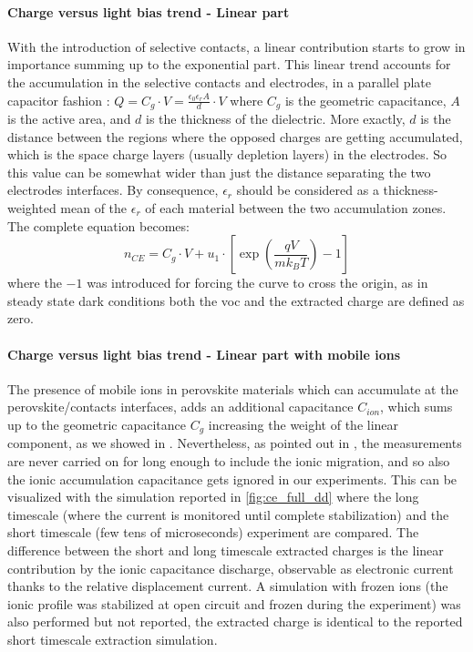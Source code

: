 \paragraph{Charge versus light bias trend - Linear part}
With the introduction of selective contacts, a linear contribution starts to grow in importance summing up to the exponential part.
This linear trend accounts for the accumulation in the selective contacts and electrodes, in a parallel plate capacitor fashion \cite{Gelmetti2017,Ryan2017a}: $Q = C_g \cdot V = \frac{\epsilon_0 \epsilon_r A}{d} \cdot V$ where $C_g$ is the geometric capacitance, $A$ is the active area, and $d$ is the thickness of the dielectric.
More exactly, $d$ is the distance between the regions where the opposed charges are getting accumulated, which is the space charge layers (usually depletion layers) in the electrodes.
So this value can be somewhat wider than just the distance separating the two electrodes interfaces.
By consequence, $\epsilon_r$ should be considered as a thickness-weighted mean of the $\epsilon_r$ of each material between the two accumulation zones.
The complete equation becomes:
\begin{equation}\label{eq:ce_full}
n_{CE} = C_g \cdot V + u_1 \cdot \left[\exp\left(\frac{qV}{mk_BT}\right) - 1\right]
\end{equation}
where the $-1$ was introduced for forcing the curve to cross the origin, as in steady state dark conditions both the \gls{voc} and the extracted charge are defined as zero.

\paragraph{Charge versus light bias trend - Linear part with mobile ions}
The presence of mobile ions in perovskite materials which can accumulate at the perovskite/contacts interfaces, adds an additional capacitance $C_{ion}$, which sums up to the geometric capacitance $C_g$ increasing the weight of the linear component, as we showed in . Nevertheless, as pointed out in , the  measurements are never carried on for long enough to include the ionic migration, and so also the ionic accumulation capacitance gets ignored in our experiments. This can be visualized with the simulation reported in \cref{fig:ce_full_dd} where the long timescale (where the current is monitored until complete stabilization) and the short timescale (few tens of microseconds)  experiment are compared. The difference between the short and long timescale extracted charges is the linear contribution by the ionic capacitance discharge, observable as electronic current thanks to the relative displacement current. A simulation with frozen ions (the ionic profile was stabilized at open circuit and frozen during the  experiment) was also performed but not reported, the extracted charge is identical to the reported short timescale extraction simulation.

